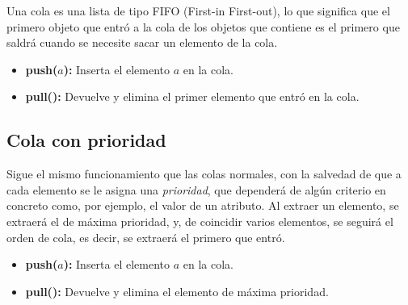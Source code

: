 Una cola es una lista de tipo FIFO (First-in First-out), lo que significa que el primero objeto que entró a la cola de los objetos que contiene es el primero que saldrá cuando se necesite sacar un elemento de la cola.

\begin{itemize}
	\item \textbf{push($a$):} Inserta el elemento $a$ en la cola.
	\item \textbf{pull():} Devuelve y elimina el primer elemento que entró en la cola.
\end{itemize}

\subsection{Cola con prioridad}
	
Sigue el mismo funcionamiento que las colas normales, con la salvedad de que a cada elemento se le asigna una \textit{prioridad}, que dependerá de algún criterio en concreto como, por ejemplo, el valor de un atributo. Al extraer un elemento, se extraerá el de máxima prioridad, y, de coincidir varios elementos, se seguirá el orden de cola, es decir, se extraerá el primero que entró.

\begin{itemize}
	\item \textbf{push($a$):} Inserta el elemento $a$ en la cola.
	\item \textbf{pull():} Devuelve y elimina el elemento de máxima prioridad.
\end{itemize}

		
\endinput



